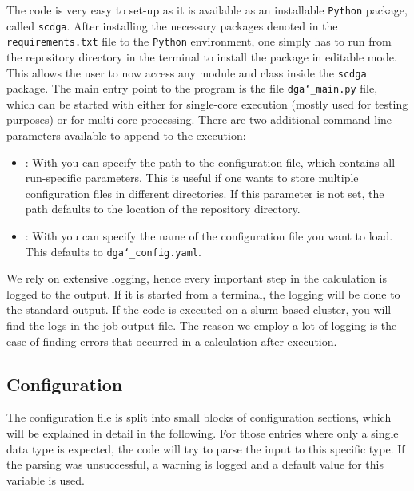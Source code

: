 \documentclass[../../main.tex]{subfiles}
\begin{document}
The code is very easy to set-up as it is available as an installable \texttt{Python} package, called \texttt{scdga}. After installing the necessary packages denoted in the \texttt{requirements.txt} file to the \texttt{Python} environment, one simply has to run  from the repository directory in the terminal to install the package in editable mode. This allows the user to now access any module and class inside the \texttt{scdga} package. The main entry point to the program is the file \texttt{dga\char`_main.py} file, which can be started with either  for single-core execution (mostly used for testing purposes) or \mbox{} for multi-core processing. There are two additional command line parameters available to append to the execution:
\begin{itemize}
\item{}: With  you can specify the path to the configuration file, which contains all run-specific parameters. This is useful if one wants to store multiple configuration files in different directories. If this parameter is not set, the path defaults to the location of the repository directory.
\item{}: With  you can specify the name of the configuration file you want to load. This defaults to \texttt{dga\char`_config.yaml}.
\end{itemize}
We rely on extensive logging, hence every important step in the calculation is logged to the output. If it is started from a terminal, the logging will be done to the standard output. If the code is executed on a slurm-based cluster, you will find the logs in the job output file. The reason we employ a lot of logging is the ease of finding errors that occurred in a calculation after execution.

\subsection{Configuration}

The configuration file is split into small blocks of configuration sections, which will be explained in detail in the following. For those entries where only a single data type is expected, the code will try to parse the input to this specific type. If the parsing was unsuccessful, a warning is logged and a default value for this variable is used. 
\end{document}
